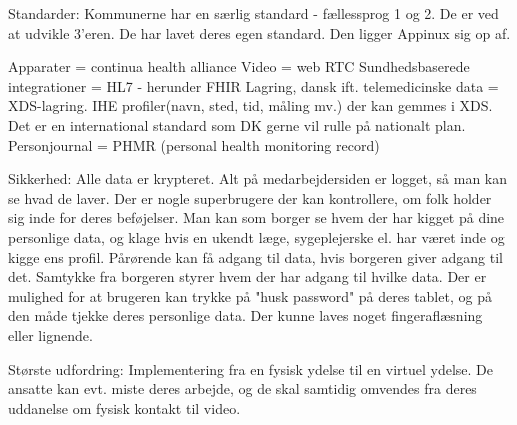 Standarder:
Kommunerne har en særlig standard - fællessprog 1 og 2. De er ved at udvikle 3'eren.
De har lavet deres egen standard.
Den ligger Appinux sig op af. 

Apparater = continua health alliance
Video = web RTC
Sundhedsbaserede integrationer = HL7 - herunder FHIR
Lagring, dansk ift. telemedicinske data = XDS-lagring. IHE profiler(navn, sted, tid, måling mv.) der kan gemmes i XDS. Det er en international standard som DK gerne vil rulle på nationalt plan.
Personjournal = PHMR (personal health monitoring record)



Sikkerhed:
Alle data er krypteret.
Alt på medarbejdersiden er logget, så man kan se hvad de laver. 
Der er nogle superbrugere der kan kontrollere, om folk holder sig inde for deres beføjelser. 
Man kan som borger se hvem der har kigget på dine personlige data, og klage hvis en ukendt læge, sygeplejerske el. har været inde og kigge ens profil.
Pårørende kan få adgang til data, hvis borgeren giver adgang til det. 
Samtykke fra borgeren styrer hvem der har adgang til hvilke data.
Der er mulighed for at brugeren kan trykke på "husk password" på deres tablet, og på den måde tjekke deres personlige data. Der kunne laves noget fingeraflæsning eller lignende. 


Største udfordring:
Implementering fra en fysisk ydelse til en virtuel ydelse.
De ansatte kan evt. miste deres arbejde, og de skal samtidig omvendes fra deres uddanelse om fysisk kontakt til video.	




